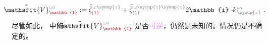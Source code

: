 \begin{align} \label{eq:plane_wave_basis-V1-nokxky}
	\xint{\mathcolor{gray}{-}}{25}{\bar{\bar{\mathsfit{V}}}}^{\;\! \mathcolor{gray}{\omega} \textcolor{PineGreen}{\imath}}_{\textcolor{Maroon}{\mathbb{1}}} := \bar{\bar{\zeta}}^{\;\! \mathcolor{gray}{\omega} \mathcolor{gray}{\symup{z}}}_{\textcolor{Maroon}{(1)}} + \bar{\bar{\zeta}}^{\;\! \mathcolor{gray}{\omega} \mathcolor{gray}{\symup{z} \symup{z}}}_{\textcolor{Maroon}{(1)}} 2\mathbb{i} \xint{\begin{smallmatrix} ~ \\ {}^{}_{\mathcolor{gray}{-}} \\ ~ \end{smallmatrix}}{15}{k}_{\;\! \mathcolor{gray}{\symup{z}}}^{\;\! \mathcolor{gray}{\omega} \textcolor{PineGreen}{\imath}} ~.
\end{align}
尽管如此， 中的 $\xint{\mathcolor{gray}{-}}{25}{\bar{\bar{\mathsfit{V}}}}^{\;\! \mathcolor{gray}{\omega} \textcolor{PineGreen}{\imath}}_{\textcolor{Maroon}{\mathbb{1}}}$ 是否\textcolor{Plum}{可逆}，仍然是未知的。情况仍是不确定的。

